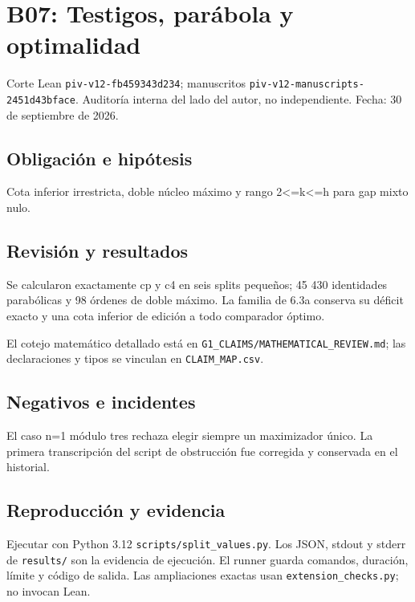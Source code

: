 \section{B07: Testigos, parábola y
optimalidad}\label{b07-testigos-paruxe1bola-y-optimalidad}

Corte Lean \texttt{piv-v12-fb459343d234}; manuscritos
\texttt{piv-v12-manuscripts-2451d43bface}. Auditoría interna del lado
del autor, no independiente. Fecha: 30 de septiembre de 2026.

\subsection{Obligación e hipótesis}\label{obligaciuxf3n-e-hipuxf3tesis}

Cota inferior irrestricta, doble núcleo máximo y rango
2\textless=k\textless=h para gap mixto nulo.

\subsection{Revisión y resultados}\label{revisiuxf3n-y-resultados}

Se calcularon exactamente cp y c4 en seis splits pequeños; 45 430
identidades parabólicas y 98 órdenes de doble máximo. La familia de 6.3a
conserva su déficit exacto y una cota inferior de edición a todo
comparador óptimo.

El cotejo matemático detallado está en
\texttt{G1\_CLAIMS/MATHEMATICAL\_REVIEW.md}; las declaraciones y tipos
se vinculan en \texttt{CLAIM\_MAP.csv}.

\subsection{Negativos e incidentes}\label{negativos-e-incidentes}

El caso n=1 módulo tres rechaza elegir siempre un maximizador único. La
primera transcripción del script de obstrucción fue corregida y
conservada en el historial.

\subsection{Reproducción y evidencia}\label{reproducciuxf3n-y-evidencia}

Ejecutar con Python 3.12 \texttt{scripts/split\_values.py}. Los JSON,
stdout y stderr de \texttt{results/} son la evidencia de ejecución. El
runner guarda comandos, duración, límite y código de salida. Las
ampliaciones exactas usan \texttt{extension\_checks.py}; no invocan
Lean.

